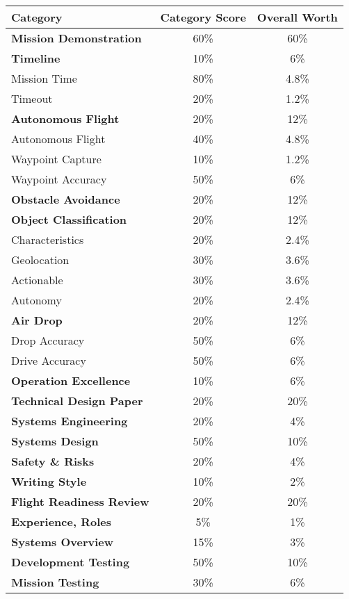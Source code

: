 \documentclass[]{auvsi_doc}
\begin{document}
\CapstoneTitlePage

\begin{center}
\begin{tabular}{l c c}
	\large{\textbf{Category}}			& \large{\textbf{Category Score}} 	&	\large{\textbf{Overall Worth}} \\
	\hline\hline
	\textbf{Mission Demonstration}				& 60\%				&	60\% \\
	\hline
	\quad \textbf{Timeline}					  	& 10\%				& 	6\% \\
	\qquad Mission Time 						& 80\%				& 	4.8\% \\
	\qquad Timeout									& 20\%				& 	1.2\% \\
	\quad \textbf{Autonomous Flight}				& 20\%				& 	12\%	\\
	\qquad Autonomous Flight 						& 40\%				& 	4.8\%	\\
	\qquad Waypoint Capture	 						& 10\%				& 	1.2\%	\\
	\qquad Waypoint Accuracy						& 50\%				& 	6\% 	\\
	\quad \textbf{Obstacle Avoidance}			& 20\%				& 	12\%	\\
	\quad \textbf{Object Classification}			& 20\%				&	12\%	\\
	\qquad Characteristics							& 20\%				& 	2.4\%	\\
	\qquad Geolocation								& 30\%				&	3.6\%	\\
	\qquad Actionable								& 30\%				& 	3.6\%	\\
	\qquad Autonomy									& 20\%				&	2.4\%	\\
	\quad \textbf{Air Drop}						& 20\%				&	12\%	\\
	\qquad Drop Accuracy 							& 50\%				&	6\%		\\
	\qquad Drive Accuracy 							& 50\%				&	6\%		\\
	\quad \textbf{Operation Excellence}			& 10\%				& 	6\%		\\
	\hline
	\textbf{Technical Design Paper} 			& 20\%				&	20\%	\\
	\hline
	\quad \textbf{Systems Engineering}			& 20\%				& 	4\%		\\
	\quad \textbf{Systems Design}				& 50\%				&	10\%	\\
	\quad \textbf{Safety \& Risks}				& 20\%				&	4\%		\\
	\quad \textbf{Writing Style}					& 10\%				&	2\%		\\
	\hline
	\textbf{Flight Readiness Review} 			& 20\%				&	20\%	\\
	\hline
	\quad \textbf{Experience, Roles}				& 5\%				& 	1\%		\\
	\quad \textbf{Systems Overview}				& 15\%				&	3\%		\\
	\quad \textbf{Development Testing}				& 50\%				&	10\%	\\
	\quad \textbf{Mission Testing}					& 30\%				&	6\%		\\
\end{tabular}
\end{center}
\end{document}
